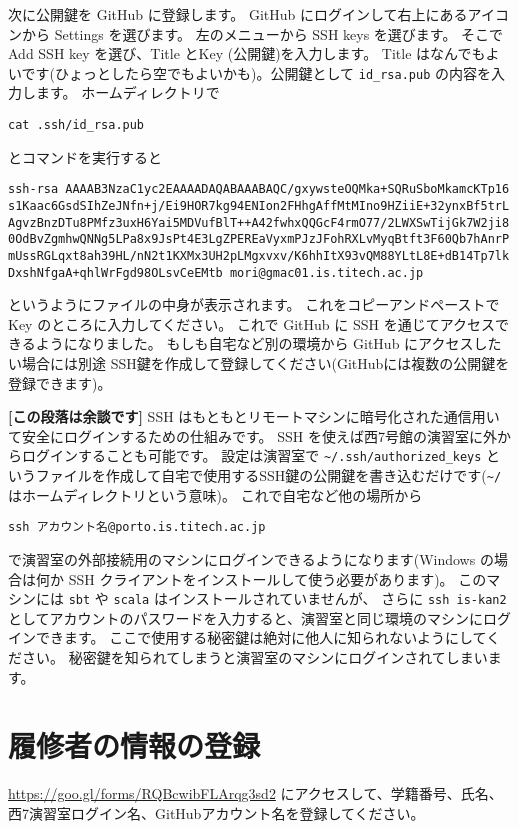 \documentclass[a4paper,11pt, article]{memoir}
\begin{document}
次に公開鍵を GitHub に登録します。
GitHub にログインして右上にあるアイコンから Settings を選びます。
左のメニューから SSH keys を選びます。
そこで Add SSH key を選び、Title  とKey (公開鍵)を入力します。
Title はなんでもよいです(ひょっとしたら空でもよいかも)。公開鍵として \texttt{id\_rsa.pub} の内容を入力します。
ホームディレクトリで
\begin{verbatim}
cat .ssh/id_rsa.pub
\end{verbatim}
とコマンドを実行すると
\small
\begin{verbatim}
ssh-rsa AAAAB3NzaC1yc2EAAAADAQABAAABAQC/gxywsteOQMka+SQRuSboMkamcKTp16
s1Kaac6GsdSIhZeJNfn+j/Ei9HOR7kg94ENIon2FHhgAffMtMIno9HZiiE+32ynxBf5trL
AgvzBnzDTu8PMfz3uxH6Yai5MDVufBlT++A42fwhxQQGcF4rmO77/2LWXSwTijGk7W2ji8
0OdBvZgmhwQNNg5LPa8x9JsPt4E3LgZPEREaVyxmPJzJFohRXLvMyqBtft3F60Qb7hAnrP
mUssRGLqxt8ah39HL/nN2t1KXMx3UH2pLMgxvxv/K6hhItX93vQM88YLtL8E+dB14Tp7lk
DxshNfgaA+qhlWrFgd98OLsvCeEMtb mori@gmac01.is.titech.ac.jp
\end{verbatim}
\normalsize
というようにファイルの中身が表示されます。
これをコピーアンドペーストで Key のところに入力してください。
%
これで GitHub に SSH を通じてアクセスできるようになりました。
もしも自宅など別の環境から GitHub にアクセスしたい場合には別途 SSH鍵を作成して登録してください(GitHubには複数の公開鍵を登録できます)。

\textbf{[この段落は余談です]} SSH はもともとリモートマシンに暗号化された通信用いて安全にログインするための仕組みです。
SSH を使えば西7号館の演習室に外からログインすることも可能です。
設定は演習室で \texttt{\~{}/.ssh/authorized\_keys} というファイルを作成して自宅で使用するSSH鍵の公開鍵を書き込むだけです(\texttt{\~{}/}はホームディレクトリという意味)。
これで自宅など他の場所から
\begin{verbatim}
ssh アカウント名@porto.is.titech.ac.jp
\end{verbatim}
で演習室の外部接続用のマシンにログインできるようになります(Windows の場合は何か SSH クライアントをインストールして使う必要があります)。
このマシンには \texttt{sbt} や \texttt{scala} はインストールされていませんが、
さらに \texttt{ssh is-kan2} としてアカウントのパスワードを入力すると、演習室と同じ環境のマシンにログインできます。
ここで使用する秘密鍵は絶対に他人に知られないようにしてください。
秘密鍵を知られてしまうと演習室のマシンにログインされてしまいます。


\section{履修者の情報の登録}
\url{https://goo.gl/forms/RQBcwibFLArqg3sd2} にアクセスして、学籍番号、氏名、西7演習室ログイン名、GitHubアカウント名を登録してください。
\end{document}
